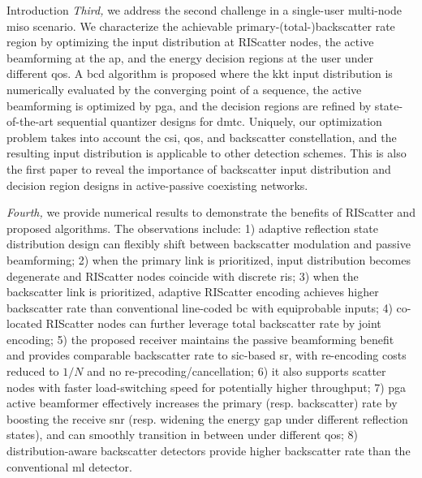 \begin{section}{Introduction}
	\emph{Third,} we address the second challenge in a single-user multi-node \gls{miso} scenario.
	We characterize the achievable primary-(total-)backscatter rate region by optimizing the input distribution at RIScatter nodes, the active beamforming at the \gls{ap}, and the energy decision regions at the user under different \gls{qos}.
	A \gls{bcd} algorithm is proposed where the \gls{kkt} input distribution is numerically evaluated by the converging point of a sequence, the active beamforming is optimized by \gls{pga}, and the decision regions are refined by state-of-the-art sequential quantizer designs for \gls{dmtc}.
	Uniquely, our optimization problem takes into account the \gls{csi}, \gls{qos}, and backscatter constellation, and the resulting input distribution is applicable to other detection schemes.
	This is also the first paper to reveal the importance of backscatter input distribution and decision region designs in active-passive coexisting networks.

	\emph{Fourth,} we provide numerical results to demonstrate the benefits of RIScatter and proposed algorithms.
	The observations include:
	1) adaptive reflection state distribution design can flexibly shift between backscatter modulation and passive beamforming;
	2) when the primary link is prioritized, input distribution becomes degenerate and RIScatter nodes coincide with discrete \gls{ris};
	3) when the backscatter link is prioritized, adaptive RIScatter encoding achieves higher backscatter rate than conventional line-coded \gls{bc} with equiprobable inputs;
	4) co-located RIScatter nodes can further leverage total backscatter rate by joint encoding;
	5) the proposed receiver maintains the passive beamforming benefit and provides comparable backscatter rate to \gls{sic}-based \gls{sr}, with re-encoding costs reduced to $1/N$ and no re-precoding/cancellation;
	6) it also supports scatter nodes with faster load-switching speed for potentially higher throughput;
	7) \gls{pga} active beamformer effectively increases the primary (resp. backscatter) rate by boosting the receive \gls{snr} (resp. widening the energy gap under different reflection states), and can smoothly transition in between under different \gls{qos};
	8) distribution-aware backscatter detectors provide higher backscatter rate than the conventional \gls{ml} detector.
\end{section}


